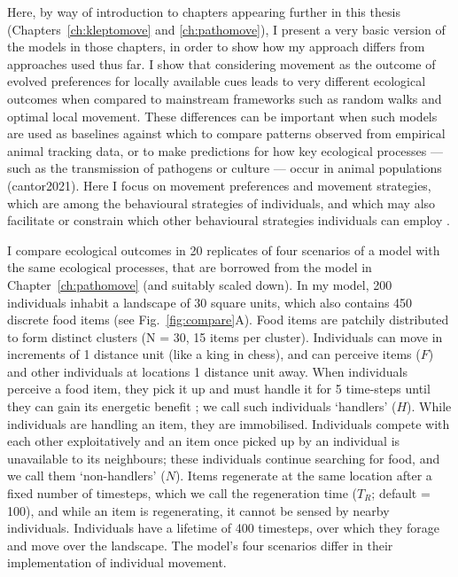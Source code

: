 Here, by way of introduction to chapters appearing further in this thesis (Chapters~\ref{ch:kleptomove} and \ref{ch:pathomove}), I present a very basic version of the models in those chapters, in order to show how my approach differs from approaches used thus far.
I show that considering movement as the outcome of evolved preferences for locally available cues leads to very different ecological outcomes when compared to mainstream frameworks such as random walks and optimal local movement.
These differences can be important when such models are used as baselines against which to compare patterns observed from empirical animal tracking data, or to make predictions for how key ecological processes --- such as the transmission of pathogens or culture --- occur in animal populations (cantor2021).
Here I focus on movement preferences and movement strategies, which are among the behavioural strategies of individuals, and which may also facilitate or constrain which other behavioural strategies individuals can employ \citep{nathan2008a,spiegel2017}.

I compare ecological outcomes in 20 replicates of four scenarios of a model with the same ecological processes, that are borrowed from the model in Chapter~\ref{ch:pathomove} (and suitably scaled down).
In my model, 200 individuals inhabit a landscape of 30 square units, which also contains 450 discrete food items (see Fig.~\ref{fig:compare}A).
Food items are patchily distributed to form distinct clusters (N = 30, 15 items per cluster).
Individuals can move in increments of 1 distance unit (like a king in chess), and can perceive items ($F$) and other individuals at locations 1 distance unit away.
When individuals perceive a food item, they pick it up and must handle it for 5 time-steps until they can gain its energetic benefit \citep{ruxton1992,gupte2021a,gupte2022c}; we call such individuals `handlers' ($H$).
While individuals are handling an item, they are immobilised.
Individuals compete with each other exploitatively and an item once picked up by an individual is unavailable to its neighbours; these individuals continue searching for food, and we call them `non-handlers' ($N$).
Items regenerate at the same location after a fixed number of timesteps, which we call the regeneration time ($T_R$; default = 100), and while an item is regenerating, it cannot be sensed by nearby individuals.
Individuals have a lifetime of 400 timesteps, over which they forage and move over the landscape.
The model's four scenarios differ in their implementation of individual movement.

